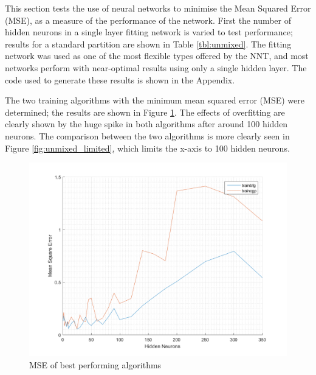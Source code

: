 \documentclass[a4paper, 10pt, conference]{ieeeconf}
\begin{document}
This section tests the use of neural networks to minimise the Mean Squared Error (MSE), as a measure of the performance of the network. First the number of hidden neurons in a single layer fitting network is varied to test performance; results for a standard partition are shown in Table \ref{tbl:unmixed}. The fitting network was used as one of the most flexible types offered by the NNT, and most networks perform with near-optimal results using only a single hidden layer. The code used to generate these results is shown in the Appendix.

The two training algorithms with the minimum mean squared error (MSE) were determined; the results are shown in Figure \ref{fig:unmixed_full}. The effects of overfitting are clearly shown by the huge spike in both algorithms after around 100 hidden neurons. The comparison between the two algorithms is more clearly seen in Figure \ref{fig:unmixed_limited}, which limits the x-axis to 100 hidden neurons.

\begin{figure}[!ht]
    \centering
    \includegraphics[width=\linewidth]{pic/unmixed_best_fullrange.png}
    \caption{MSE of best performing algorithms}
    \label{fig:unmixed_full}
\end{figure}
\end{document}
